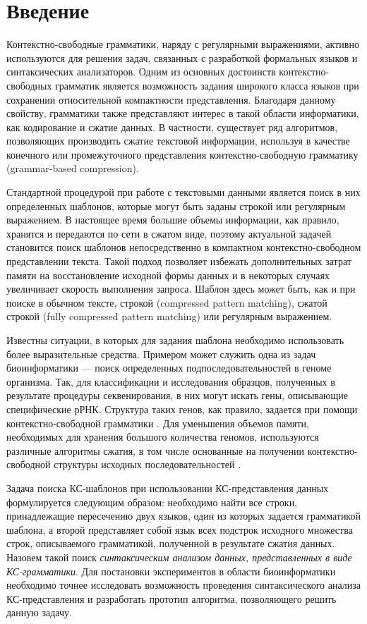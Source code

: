 \section*{Введение}

Контекстно-свободные грамматики, наряду с регулярными выражениями, активно используются для решения задач, связанных с разработкой формальных языков и синтаксических анализаторов. 
Одним из основных достоинств контекстно-свободных грамматик является возможность задания широкого класса языков при сохранении относительной компактности представления. 
Благодаря данному свойству, грамматики также представляют интерес в такой области информатики, как кодирование и сжатие данных. 
В частности, существует ряд алгоритмов, позволяющих производить сжатие текстовой информации, используя в качестве конечного \cite{sequitur} или промежуточного \cite{Arimura} представления контекстно-свободную грамматику (grammar-based compression). 

Стандартной процедурой при работе с текстовыми данными является поиск в них определенных шаблонов, которые могут быть заданы строкой или регулярным выражением. 
В настоящее время большие объемы информации, как правило, хранятся и передаются по сети в сжатом виде, поэтому актуальной задачей становится поиск шаблонов непосредственно в компактном контекстно-свободном представлении текста.
Такой подход позволяет избежать дополнительных затрат памяти на восстановление исходной формы данных и в некоторых случаях увеличивает скорость выполнения запроса.
Шаблон здесь может быть, как и при поиске в обычном тексте, строкой (compressed pattern matching), сжатой строкой (fully compressed pattern matching) или регулярным выражением.

Известны ситуации, в которых для задания шаблона необходимо использовать более выразительные средства. 
Примером может служить одна из задач биоинформатики --- поиск определенных подпоследовательностей в геноме организма. 
Так, для классификации и исследования образцов, полученных в результате процедуры секвенирования, в них могут искать гены, описывающие специфические рРНК. 
Структура таких генов, как правило, задается при помощи контекстно-свободной грамматики \cite{Anderson2013}. 
Для уменьшения объемов памяти, необходимых для хранения большого количества геномов, используются различные алгоритмы сжатия, в том числе основанные на получении контекстно-свободной структуры исходных последовательностей \cite{galle2011dna}.

Задача поиска КС-шаблонов при использовании КС-представления данных формулируется следующим образом: необходимо найти все строки, принадлежащие пересечению двух языков, один из которых задается грамматикой шаблона, а второй представляет собой язык всех подстрок исходного множества строк, описываемого грамматикой, полученной в результате сжатия данных.
Назовем такой поиск \textit{синтаксическим анализом данных, представленных в виде КС-грамматики}.
Для постановки экспериментов в области биоинформатики необходимо точнее исследовать возможность проведения синтаксического анализа КС-представления и разработать прототип алгоритма, позволяющего решить данную задачу.